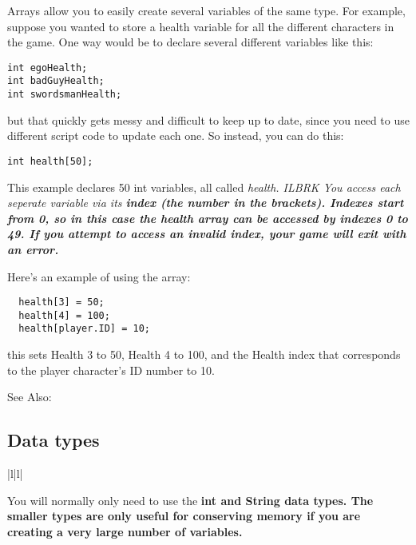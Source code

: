 Arrays allow you to easily create several variables of the same type. For example,
suppose you wanted to store a health variable for all the different characters in the game.
One way would be to declare several different variables like this:
\begin{verbatim}
int egoHealth;
int badGuyHealth;
int swordsmanHealth;
\end{verbatim}
but that quickly gets messy and difficult to keep up to date, since you need to use
different script code to update each one. So instead, you can do this:
\begin{verbatim}
int health[50];
\end{verbatim}
This example declares 50 int variables, all called \it{health}. ILBRK
You access each seperate variable via its \bf{index} (the number in the brackets). Indexes
start from 0, so in this case the \it{health} array can be accessed by indexes 0 to 49.
If you attempt to access an invalid index, your game will exit with an error.

Here's an example of using the array:
\begin{verbatim}
  health[3] = 50;
  health[4] = 100;
  health[player.ID] = 10;
\end{verbatim}
this sets Health 3 to 50, Health 4 to 100, and the Health index that corresponds to the player
character's ID number to 10.

See Also: 


\subsection{Data types}\label{Datatypes}%

\begin{tabular}{|l|l|}
\end{tabular}

You will normally only need to use the \bf{int} and \bf{String} data types. The smaller types
are only useful for conserving memory if you are creating a very large number of variables.

